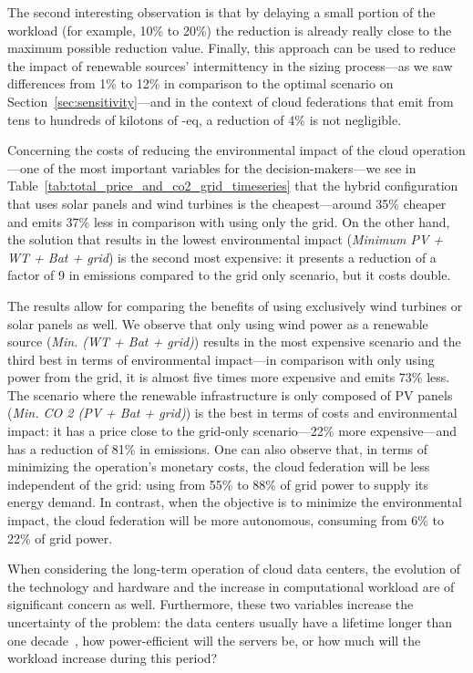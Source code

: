 The second interesting observation is that by delaying a small portion of the workload (for example, 10\% to 20\%)  the reduction is already really close to the maximum possible reduction value. Finally, this approach can be used to reduce the impact of renewable sources' intermittency in the sizing process---as we saw differences from 1\% to 12\% in comparison to the optimal scenario on Section~\ref{sec:sensitivity}---and in the context of cloud federations that emit from tens to hundreds of kilotons of -eq, a reduction of 4\% is not negligible.

Concerning the costs of reducing the environmental impact of the cloud operation---one of the most important variables for the decision-makers---we see in Table~\ref {tab:total_price_and_co2_grid_timeseries} that the hybrid configuration that uses solar panels and wind turbines is the cheapest---around 35\% cheaper and emits 37\% less  in comparison with using only the grid. On the other hand, the solution that results in the lowest environmental impact (\textit{Minimum  PV + WT + Bat + grid}) is the second most expensive: it presents a reduction of a factor of 9 in  emissions compared to the grid only scenario, but it costs double. 

The results allow for comparing the benefits of using exclusively wind turbines or solar panels as well. We observe that only using wind power as a renewable source (\textit{Min.  (WT + Bat + grid)}) results in the most expensive scenario and the third best in terms of environmental impact---in comparison with only using power from the grid, it is almost five times more expensive and emits 73\% less. The scenario where the renewable infrastructure is only composed of PV panels (\textit{Min. CO 2 (PV + Bat + grid)}) is the best in terms of costs and environmental impact: it has a price close to the grid-only scenario---22\% more expensive---and has a reduction of 81\% in  emissions. One can also observe that, in terms of minimizing the operation's monetary costs, the cloud federation will be less independent of the grid: using from 55\% to 88\% of grid power to supply its energy demand. In contrast, when the objective is to minimize the environmental impact, the cloud federation will be more autonomous, consuming from 6\% to 22\% of grid power.

When considering the long-term operation of cloud data centers, the evolution of the technology and hardware and the increase in computational workload are of significant concern as well. Furthermore, these two variables increase the uncertainty of the problem: the data centers usually have a lifetime longer than one decade~\cite{datacenter_as_computer}, how power-efficient will the servers be, or how much will the workload increase during this period? 

